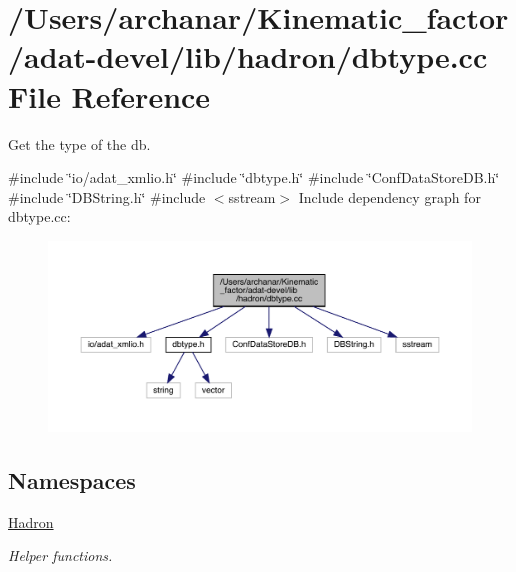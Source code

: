\hypertarget{adat-devel_2lib_2hadron_2dbtype_8cc}{}\section{/\+Users/archanar/\+Kinematic\+\_\+factor/adat-\/devel/lib/hadron/dbtype.cc File Reference}
\label{adat-devel_2lib_2hadron_2dbtype_8cc}


Get the type of the db.  


{\ttfamily \#include \char`\"{}io/adat\+\_\+xmlio.\+h\char`\"{}}\newline
{\ttfamily \#include \char`\"{}dbtype.\+h\char`\"{}}\newline
{\ttfamily \#include \char`\"{}Conf\+Data\+Store\+D\+B.\+h\char`\"{}}\newline
{\ttfamily \#include \char`\"{}D\+B\+String.\+h\char`\"{}}\newline
{\ttfamily \#include $<$sstream$>$}\newline
Include dependency graph for dbtype.\+cc\+:
\nopagebreak
\begin{figure}[H]
\begin{center}
\leavevmode
\includegraphics[width=350pt]{d5/d01/adat-devel_2lib_2hadron_2dbtype_8cc__incl}
\end{center}
\end{figure}
\subsection*{Namespaces}
\begin{DoxyCompactItemize}
\item 
 \mbox{\hyperlink{namespaceHadron}{Hadron}}
\begin{DoxyCompactList}\small\item\em Helper functions. \end{DoxyCompactList}\end{DoxyCompactItemize}

